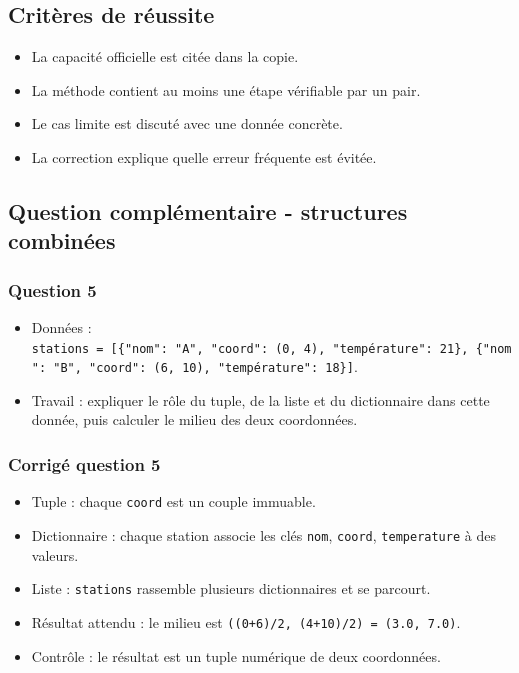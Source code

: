 \subsection{Critères de réussite}

\begin{itemize}
\tightlist
\item
  La capacité officielle est citée dans la copie.
\item
  La méthode contient au moins une étape vérifiable par un pair.
\item
  Le cas limite est discuté avec une donnée concrète.
\item
  La correction explique quelle erreur fréquente est évitée.
\end{itemize}

\subsection{Question complémentaire - structures combinées}

\subsubsection{Question 5}

\begin{itemize}
\tightlist
\item
  Données :
  \texttt{stations\ =\ {[}\{"nom":\ "A",\ "coord":\ (0,\ 4),\ "température":\ 21\},\ \{"nom":\ "B",\ "coord":\ (6,\ 10),\ "température":\ 18\}{]}}.
\item
  Travail : expliquer le rôle du tuple, de la liste et du dictionnaire
  dans cette donnée, puis calculer le milieu des deux coordonnées.
\end{itemize}

\subsubsection{Corrigé question 5}

\begin{itemize}
\tightlist
\item
  Tuple : chaque \texttt{coord} est un couple immuable.
\item
  Dictionnaire : chaque station associe les clés \texttt{nom},
  \texttt{coord}, \texttt{temperature} à des valeurs.
\item
  Liste : \texttt{stations} rassemble plusieurs dictionnaires et se
  parcourt.
\item
  Résultat attendu : le milieu est
  \texttt{((0+6)/2,\ (4+10)/2)\ =\ (3.0,\ 7.0)}.
\item
  Contrôle : le résultat est un tuple numérique de deux coordonnées.
\end{itemize}

